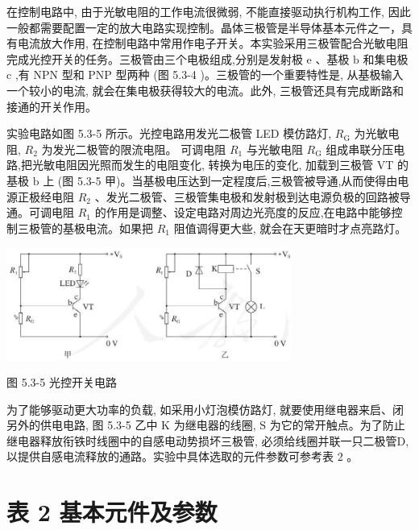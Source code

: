 \documentclass[10pt]{article}
\begin{document}
在控制电路中, 由于光敏电阻的工作电流很微弱, 不能直接驱动执行机构工作, 因此一般都需要配置一定的放大电路实现控制。晶体三极管是半导体基本元件之一，具有电流放大作用, 在控制电路中常用作电子开关。本实验采用三极管配合光敏电阻完成光控开关的任务。三极管由三个电极组成,分别是发射极 \(\mathrm{e}\) 、基极 \(\mathrm{b}\) 和集电极 \(\mathrm{c}\) ,有 NPN 型和 PNP 型两种 (图 5.3-4 )。三极管的一个重要特性是, 从基极输入一个较小的电流, 就会在集电极获得较大的电流。此外, 三极管还具有完成断路和接通的开关作用。

实验电路如图 5.3-5 所示。光控电路用发光二极管 LED 模仿路灯, \({R}_{\mathrm{G}}\) 为光敏电阻, \({R}_{2}\) 为发光二极管的限流电阻。 可调电阻 \({R}_{1}\) 与光敏电阻 \({R}_{\mathrm{G}}\) 组成串联分压电路,把光敏电阻因光照而发生的电阻变化, 转换为电压的变化, 加载到三极管 VT 的基极 \(\mathrm{b}\) 上 (图 5.3-5 甲)。当基极电压达到一定程度后,三极管被导通,从而使得由电源正极经电阻 \({R}_{2}\) 、发光二极管、三极管集电极和发射极到达电源负极的回路被导通。可调电阻 \({R}_{1}\) 的作用是调整、设定电路对周边光亮度的反应,在电路中能够控制三极管的基极电流。如果把 \({R}_{1}\) 阻值调得更大些, 就会在天更暗时才点亮路灯。

\begin{center}
\includegraphics[max width=0.7\textwidth]{images/01910e72-c5b7-7ed5-a6d4-fb3a5faefc32_110_534114.jpg}
\end{center}

图 5.3-5 光控开关电路

为了能够驱动更大功率的负载, 如采用小灯泡模仿路灯, 就要使用继电器来启、闭另外的供电电路, 图 5.3-5 乙中 \(\mathrm{K}\) 为继电器的线圈, \(\mathrm{S}\) 为它的常开触点。为了防止继电器释放衔铁时线圈中的自感电动势损坏三极管, 必须给线圈并联一只二极管D, 以提供自感电流释放的通路。实验中具体选取的元件参数可参考表 2 。

\section*{表 2 基本元件及参数}
\end{document}
